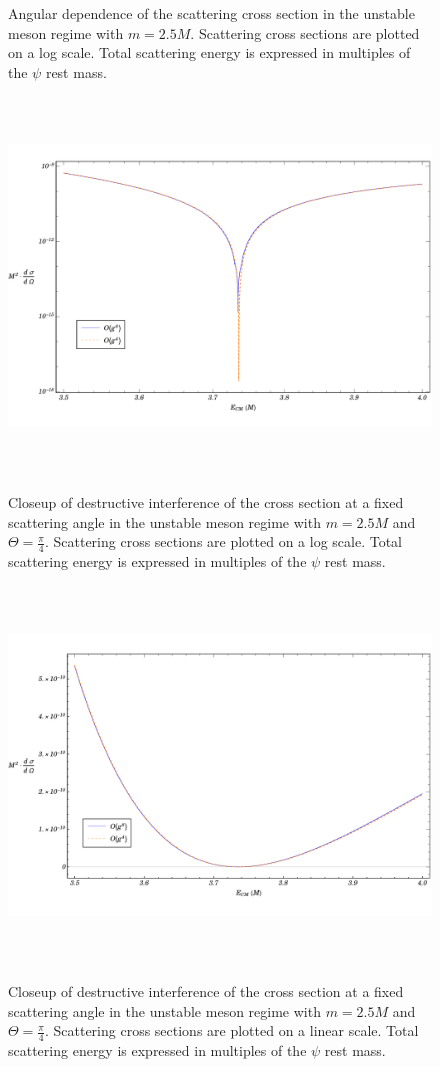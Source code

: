 \documentclass[12pt]{extarticle}
\begin{document}
\begin{figure}
\begin{center}
\vspace*{-1cm}
\caption{Angular dependence of the scattering cross section in the unstable meson regime with $m = 2.5 M$. Scattering cross sections are plotted on a log scale. Total scattering energy is expressed in multiples of the $\psi$ rest mass.} 
\label{unstable-angular}
\end{center}
\end{figure} 


\begin{figure}
\begin{center}
\includegraphics[width=15cm, height=10cm]{AntiResonance}
\caption{Closeup of destructive interference of the cross section at a fixed scattering angle in the unstable meson regime with $m = 2.5 M$ and $\Theta = \frac{\pi}{4}$. Scattering cross sections are plotted on a log scale. Total scattering energy is expressed in multiples of the $\psi$ rest mass.} 
\label{AntiResonance}
\includegraphics[width=15cm, height=10cm]{NoLogAntiResonance}
\caption{Closeup of destructive interference of the cross section at a fixed scattering angle in the unstable meson regime with $m = 2.5 M$ and $\Theta = \frac{\pi}{4}$. Scattering cross sections are plotted on a linear scale. Total scattering energy is expressed in multiples of the $\psi$ rest mass.} 
\label{NoLogAntiResonance}
\end{center}
\end{figure}
\end{document}
